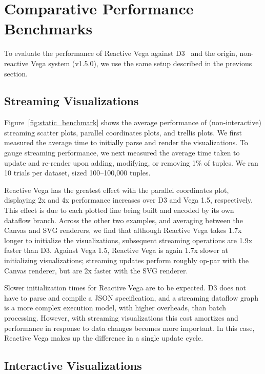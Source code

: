\section{Comparative Performance Benchmarks}
\label{sec:vg:performance}

To evaluate the performance of Reactive Vega against D3~\cite{bostock:d3} and
the origin, non-reactive Vega system (v1.5.0), we use the same setup described
in the previous section.

\subsection{Streaming Visualizations}

Figure~\ref{fig:static_benchmark} shows the average performance of
(non\--interactive) streaming scatter plots, parallel coordinates plots, and
trellis plots. We first measured the average time to initially parse and render
the visualizations. To gauge streaming performance, we next measured the average
time taken to update and re-render upon adding, modifying, or removing 1\% of
tuples. We ran 10 trials per dataset, sized 100--100,000 tuples.

Reactive Vega has the greatest effect with the parallel coordinates plot,
displaying 2x and 4x performance increases over D3 and Vega 1.5, respectively.
This effect is due to each plotted line being built and encoded by its own
dataflow branch. Across the other two examples, and averaging between the Canvas
and SVG renderers, we find that although Reactive Vega takes 1.7x longer to
initialize the visualizations, subsequent streaming operations are 1.9x faster
than D3. Against Vega 1.5, Reactive Vega is again 1.7x slower at initializing
visualizations; streaming updates perform roughly op-par with the Canvas
renderer, but are 2x faster with the SVG renderer.

Slower initialization times for Reactive Vega are to be expected. D3 does not
have to parse and compile a JSON specification, and a streaming dataflow graph
is a more complex execution model, with higher overheads, than batch processing.
However, with streaming visualizations this cost amortizes and performance in
response to data changes becomes more important. In this case, Reactive Vega
makes up the difference in a single update cycle.

\subsection{Interactive Visualizations}

